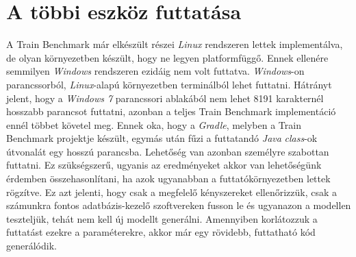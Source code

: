 \section{A többi eszköz futtatása}

A Train Benchmark már elkészült részei \emph{Linux} rendszeren lettek implementálva, de olyan környezetben készült, hogy ne legyen platformfüggő. Ennek ellenére semmilyen \emph{Windows} rendszeren ezidáig nem volt futtatva. \emph{Windows}-on parancssorból, \emph{Linux}-alapú környezetben terminálból lehet futtatni. Hátrányt jelent, hogy a \emph{Windows 7} parancssori ablakából nem lehet 8191 karakternél hosszabb parancsot futtatni\cite{cmdLimitation}, azonban a teljes Train Benchmark implementáció ennél többet követel meg. Ennek oka, hogy a \emph{Gradle}, melyben a Train Benchmark projektje készült, egymás után fűzi a futtatandó \emph{Java} \emph{class}-ok útvonalát egy hosszú parancsba. Lehetőség van azonban személyre szabottan futtatni. Ez szükségszerű, ugyanis az eredményeket akkor van lehetőségünk érdemben összehasonlítani, ha azok ugyanabban a futtatókörnyezetben lettek rögzítve. Ez azt jelenti, hogy csak a megfelelő kényszereket ellenőrizzük, csak a számunkra fontos adatbázis-kezelő szoftvereken fusson le és ugyanazon a modellen teszteljük, tehát nem kell új modellt generálni. Amennyiben korlátozzuk a futtatást ezekre a paraméterekre, akkor már egy rövidebb, futtatható kód generálódik.